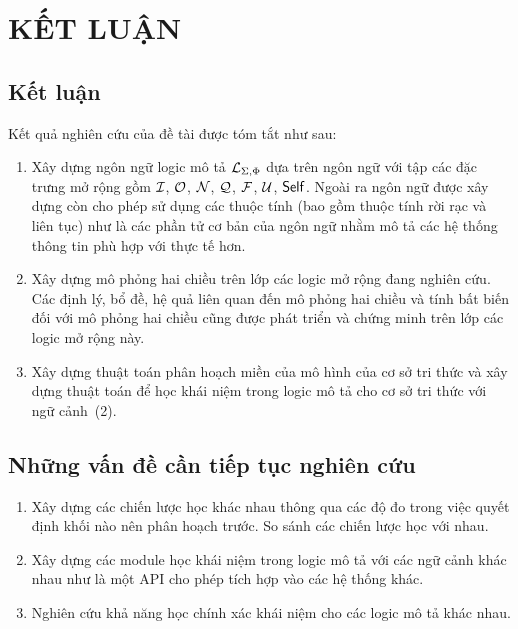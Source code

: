 \chapter*{KẾT LUẬN}
\label{ChapterKetLuan}
\thispagestyle{fancy}
\section*{Kết luận}
Kết quả nghiên cứu của đề tài được tóm tắt như sau:
\begin{enumerate}
	\item Xây dựng ngôn ngữ logic mô tả $\mathcal{L}_{\Sigma,\Phi}$ dựa trên ngôn ngữ \ALCreg với tập các đặc trưng mở rộng gồm $\mathcal{I}$, $\mathcal{O}$, $\mathcal{N}$, $\mathcal{Q}$, $\mathcal{F}$, $\mathcal{U}$, $\mathsf{Self}$. Ngoài ra ngôn ngữ được xây dựng còn cho phép sử dụng các thuộc tính (bao gồm thuộc tính rời rạc và liên tục) như là các phần tử cơ bản của ngôn ngữ nhằm mô tả các hệ thống thông tin phù hợp với thực tế hơn.
	
	\item Xây dựng mô phỏng hai chiều trên lớp các logic mở rộng đang nghiên cứu. Các định lý, bổ đề, hệ quả liên quan đến mô phỏng hai chiều và tính bất biến đối với mô phỏng hai chiều cũng được phát triển và chứng minh trên lớp các logic mở rộng này.
	
	\item Xây dựng thuật toán phân hoạch miền của mô hình của cơ sở tri thức và xây dựng thuật toán \BBCLearnS để học khái niệm trong logic mô tả cho cơ sở tri thức với ngữ cảnh~(2).
\end{enumerate}

\section*{Những vấn đề cần tiếp tục nghiên cứu}
\begin{enumerate}
	\item Xây dựng các chiến lược học khác nhau thông qua các độ đo trong việc quyết định khối nào nên phân hoạch trước. So sánh các chiến lược học với nhau.
	
	\item Xây dựng các module học khái niệm trong logic mô tả với các ngữ cảnh khác 	nhau như là một API cho phép tích hợp vào các hệ thống khác.
	
	\item Nghiên cứu khả năng học chính xác khái niệm cho các logic mô tả khác nhau.
\end{enumerate}
\cleardoublepage


